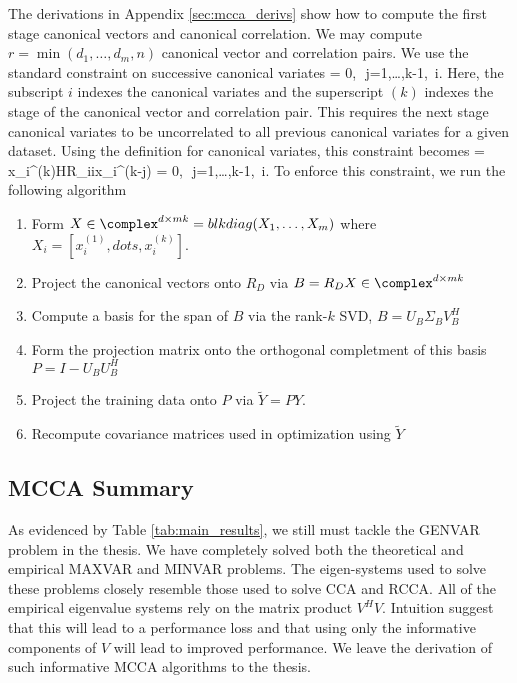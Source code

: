 The derivations in Appendix \ref{sec:mcca_derivs} show how to compute the first stage
canonical vectors and canonical correlation. We may compute $r=\min(d_1,\dots,d_m,n)$
canonical vector and correlation pairs. We use the standard constraint on successive
canonical variates
\be
{} = 0,\,\,  j=1,\dots,k-1,\,\,\,\forall i.
\ee
Here, the subscript $i$ indexes the canonical variates and the superscript $(k)$ indexes
the stage of the canonical vector and correlation pair. This requires the next stage
canonical variates to be uncorrelated to all previous canonical variates for a given
dataset. Using the definition for canonical variates, this constraint becomes
\be
{} = x_i^{(k)H}R_{ii}x_i^{(k-j)} = 0,\,\, 
j=1,\dots,k-1,\,\,\,\forall i. 
\ee
To enforce this constraint, we run the following algorithm
\begin{enumerate}
\item Form $X\in\complex^{d\times mk}=blkdiag(X_1,\dots,X_m)$ where $X_i = [x_i^{(1)},dots,x_i^{(k)}]$.
\item Project the canonical vectors onto $R_D$ via $B = R_DX \in\complex^{d\times mk}$
\item Compute a basis for the span of $B$ via the rank-$k$ SVD, $B=U_B\Sigma_B V_B^H$
\item Form the projection matrix onto the orthogonal completment of this basis $P = I -
  U_BU_B^H$
\item Project the training data onto $P$ via $\widetilde{Y} = PY$.
\item Recompute covariance matrices used in optimization using $\widetilde{Y}$
\end{enumerate}

\subsection{MCCA Summary}\label{sec:summary}

As evidenced by Table \ref{tab:main_results}, we still must tackle the GENVAR problem in the
thesis. We have completely solved both the theoretical and empirical MAXVAR and MINVAR
problems. The eigen-systems used to solve these problems closely resemble those used to
solve CCA and RCCA. All of the empirical eigenvalue systems rely on the matrix product
$V^HV$. Intuition suggest that this will lead to a performance loss and that using only
the informative components of $V$ will lead to improved performance. We leave the
derivation of such informative MCCA algorithms to the thesis. 

